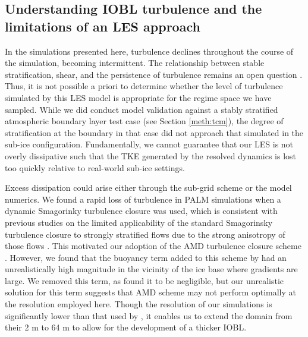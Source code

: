 \documentclass[draft]{styles/agujournal2019}
\begin{document}
\subsection{Understanding IOBL turbulence and the limitations of an LES approach} \label{disc:dyn}

In the simulations presented here, turbulence declines throughout the course of the simulation, becoming intermittent. The relationship between stable stratification, shear, and the persistence of turbulence remains an open question \cite{zonta_stably_2018}. Thus, it is not possible a priori to determine whether the level of turbulence simulated by this LES model is appropriate for the regime space we have sampled. While we did conduct model validation against a stably stratified atmospheric boundary layer test case (see Section \ref{meth:tcm}), the degree of stratification at the boundary in that case did not approach that simulated in the sub-ice configuration. Fundamentally, we cannot guarantee that our LES is not overly dissipative such that the TKE generated by the resolved dynamics is lost too quickly relative to real-world sub-ice settings. 

Excess dissipation could arise either through the sub-grid scheme or the model numerics. We found a rapid loss of turbulence in PALM simulations when a dynamic Smagorinky turbulence closure was used, which is consistent with previous studies on the limited applicability of the standard Smagorinsky turbulence closure to strongly stratified flows due to the strong anisotropy of those flows \cite{flores_analysis_2011, jimenez_large-eddy_2005}. This motivated our adoption of the AMD turbulence closure scheme \cite{abkar_minimum-dissipation_2016}. However, we found that the buoyancy term added to this scheme by  had an unrealistically high magnitude in the vicinity of the ice base where gradients are large. We removed this term, as  found it to be negligible, but our unrealistic solution for this term suggests that AMD scheme may not perform optimally at the resolution employed here. Though the resolution of our simulations is significantly lower than that used by , it enables us to extend the domain from their 2 m to 64 m to allow for the development of a thicker IOBL. 
\end{document}
